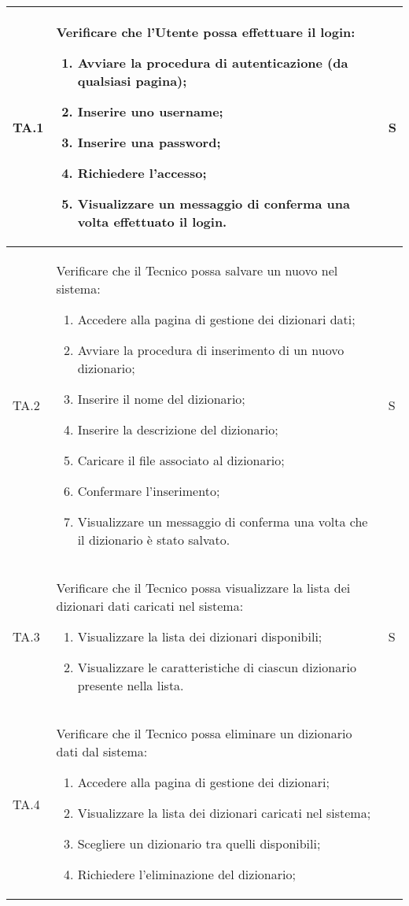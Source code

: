 \begin{adjustwidth}{-0.5cm}{-0.5cm}
\begin{longtable}{|P{1.5cm}|>{\raggedright}P{9.5cm}|>{\arraybackslash}P{1.5cm}|}
		TA.1 & Verificare che l'Utente possa effettuare il login:
		\begin{enumerate}
			\item Avviare la procedura di autenticazione (da qualsiasi pagina);
			\item Inserire uno username;
			\item Inserire una password;
			\item Richiedere l'accesso;
			\item Visualizzare un messaggio di conferma una volta effettuato il login.
		\end{enumerate}
		& S \\
		\hline TA.2 & Verificare che il Tecnico possa salvare un nuovo  nel sistema:
		\begin{enumerate}
			\item Accedere alla pagina di gestione dei dizionari dati;
			\item Avviare la procedura di inserimento di un nuovo dizionario;
			\item Inserire il nome del dizionario;
			\item Inserire la descrizione del dizionario;
			\item Caricare il file  associato al dizionario;
			\item Confermare l'inserimento;
			\item Visualizzare un messaggio di conferma una volta che il dizionario è stato salvato.
		\end{enumerate}
		& S \\
		\hline TA.3 & Verificare che il Tecnico possa visualizzare la lista dei dizionari dati caricati nel sistema:
		\begin{enumerate}
			\item Visualizzare la lista dei dizionari disponibili;
			\item Visualizzare le caratteristiche di ciascun dizionario presente nella lista.
		\end{enumerate}
		& S \\
		\hline TA.4 & Verificare che il Tecnico possa eliminare un dizionario dati dal sistema:
		\begin{enumerate}
			\item Accedere alla pagina di gestione dei dizionari;
			\item Visualizzare la lista dei dizionari caricati nel sistema;
			\item Scegliere un dizionario tra quelli disponibili;
			\item Richiedere l'eliminazione del dizionario;

\end{enumerate}
\end{longtable}
\end{adjustwidth}

